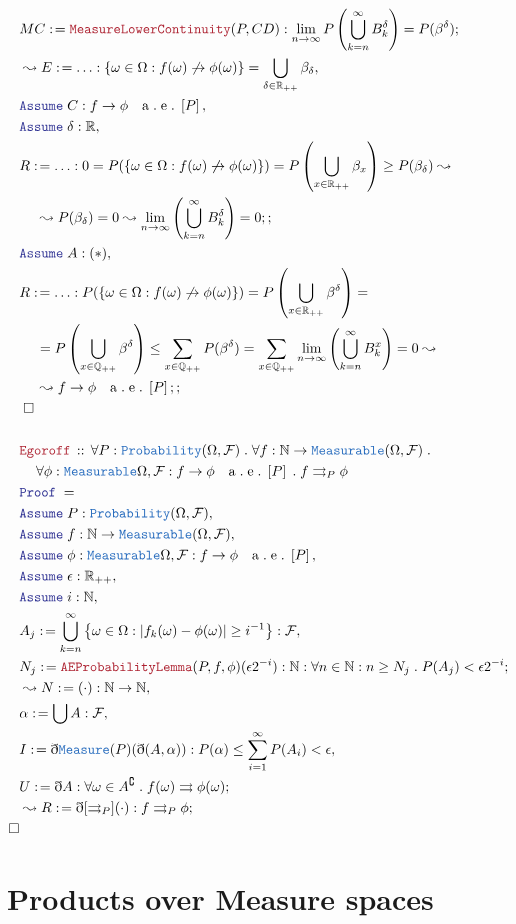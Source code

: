 \documentclass[12pt]{scrartcl}
\newcommand{\TYPE}[1]{\textcolor{NavyBlue}{\mathtt{#1}}}
\newcommand{\LOGIC}[1]{\textcolor{Blue}{\mathtt{#1}}}
\newcommand{\THM}[1]{\textcolor{Maroon}{\mathtt{#1}}}
\renewcommand{\.}{\; . \;}
\newcommand{\de}{: \kern 0.1pc =}
\newcommand{\Act}[1]{\left( #1 \right)}
\newcommand{\Theorem}[2]{& \THM{#1} \, :: \, #2 \\ & \Proof = \\ }
\newcommand{\NewLine}{\\ & \kern 1pc}
\newcommand{\ForEach}[3]{\forall #1 : #2 \. #3 }
\newcommand{\Reals}{\mathbb{R} }
\newcommand{\Rats}{\mathbb{Q} }
\newcommand{\Nat}{\mathbb{N} }
\renewcommand{\c}{\complement}
\newcommand{\Say}[3]{& #1 \de #2 : #3, \\}
\newcommand{\Conclude}[3]{& #1 \de #2 : #3; \\}
\newcommand{\Derive}[3]{& \leadsto #1 \de #2 : #3, \\}
\newcommand{\DeriveConclude}[3]{& \leadsto #1 \de #2 : #3 ; \\}
\newcommand{\A}{\LOGIC{Assume} \;}
\newcommand{\Assume}[2]{& \A #1 : #2, \\}
\newcommand{\QED}{\; \square}
\newcommand{\EndProof}{& \QED \\}
\newcommand{\ByDef}{\eth}
\newcommand{\Proof}{\LOGIC{Proof} \; }
\newcommand{\UC}{\rightrightarrows}
\renewcommand{\AE}[1]{\mathrm{a\. e\.} \left[#1\right]}
\newcommand{\F}{\mathcal{F}}
\renewcommand{\O}{\Omega}
\begin{document}
\begin{align*}
 \Conclude{MC}{\THM{MeasureLowerContinuity}(P,CD)}{\lim_{n \to \infty} P \Act{\bigcup_{k= n}^\infty B^\delta_k} = P(\beta^\delta)}
 \Derive{E}{\ldots}{ \{ \omega \in \O : f(\omega) \not \to \phi(\omega)\} = 
 \bigcup_{\delta \in \Reals_{++} } \beta_\delta}
 \Assume{C}{f \to \phi \quad \AE{P}}
 \Assume{\delta}{\Reals}
 \Conclude{ R}{\ldots}{ 0 = P(\{ \omega \in \O : f(\omega) \not \to \phi(\omega)\}) = P \Act{\bigcup_{x \in \Reals_{++} } \beta_x} \ge P(\beta_\delta) \leadsto
 \NewLine \leadsto P(\beta_\delta) = 0 \leadsto \lim_{n \to \infty}  \Act{\bigcup_{k= n}^\infty B^\delta_k} = 0 ;
 }
 \Assume{A}{(*)}
 \Conclude{R}{\ldots}{ P(\{ \omega \in \O : f(\omega) \not \to \phi(\omega)\}) = P \Act{\bigcup_{x \in \Reals_{++} } \beta^\delta } = \NewLine
  = P \Act{\bigcup_{x \in \Rats_{++}} \beta^\delta }  \le \sum_{x \in \Rats_{++}}P(\beta^\delta)  
   =  \sum_{x \in \Rats_{++}} \lim_{n \to \infty}  \Act{\bigcup_{k= n}^\infty B^x_k} = 0 
\leadsto
\NewLine
\leadsto
 f \to \phi \quad \AE{P}   ;
   }
 \EndProof
 \\
 \Theorem{Egoroff}{
\ForEach{P }{ \TYPE{Probability}(\O,\F)}{
\ForEach{f}{\Nat \to \TYPE{Measurable}(\O,\F)}{
\NewLine
\ForEach{\phi}{\TYPE{Measurable}{\O,\F} : f \to \phi \quad \AE{P}}{
 f \UC_P \phi
}}}}
\Assume{P}{\TYPE{Probability}(\O,\F)}
\Assume{f}{\Nat \to \TYPE{Measurable}(\O,\F)}
\Assume{\phi}{\TYPE{Measurable}{\O,\F} : f \to \phi \quad \AE{P}}
\Assume{\epsilon}{\Reals_{++}}
\Assume{i}{\Nat}
\Say{A_j}{\bigcup_{k=n}^\infty \left \{ \omega \in \O : |f_k(\omega) - \phi(\omega) | \ge i^{-1} \right \}}{\F}
\Conclude{N_j}{\THM{AEProbabilityLemma}(P,f,\phi)(\epsilon 2^{-i})}{\Nat : \forall n \in \Nat : n \ge N_j 
 \. P(A_j)   < \epsilon 2^{-i} }
 \Derive{N}{(\cdot)}{\Nat \to \Nat  }
 \Say{\alpha}{\bigcup A}{\F}
 \Say{I}{\ByDef\TYPE{Measure}(P)(\ByDef(A,\alpha))}{P(\alpha) \le \sum^\infty_{i=1} P(A_i) < \epsilon} 
 \Conclude{U}{\ByDef{A}}{\forall \omega \in A^\c \. f(\omega) \UC \phi(\omega)  }
 \DeriveConclude{R}{\ByDef[\UC_P](\cdot)}{f \UC_P \phi}
 \square
\end{align*}
\newpage 
\section{Products over Measure spaces }
\end{document}
